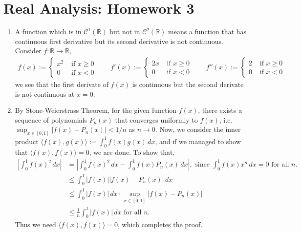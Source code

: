 \documentclass[a4paper,12pt]{article}
\theoremstyle{definition}
\begin{document}
\section*{Real Analysis: Homework 3}

\begin{enumerate}
\item
A function which is in $\mathcal{C}^1(\mathbb{R})$ but not in $\mathcal{C}^2(\mathbb{R})$ means a function that has continuous first derivative but its second derivative is not continuous. Consider $f: \mathbb{R} \to \mathbb{R}$,
\begin{align*}
f(x):=\begin{cases}
x^2 & \text{ if }x \geq 0\\
0 & \text{ if }x <0
\end{cases}\qquad
f'(x):=\begin{cases}
2x & \text{ if }x \geq 0\\
0 & \text{ if }x <0
\end{cases}\qquad
f''(x):=\begin{cases}
2 & \text{ if }x \geq 0\\
0 & \text{ if }x <0
\end{cases}
\end{align*}
we see that the first derivate of $f(x)$ is continuous but the second derivate is not continuous at $x =0$.



\item By Stone-Weierstrass Theorem, for the given function $f(x)$, there exists a sequence of polynomials $P_n(x)$ that converges uniformly to $f(x)$, i.e. $\sup_{x \in [0,1]}|f(x)-P_n(x)| <1/n$ as $n \to 0$. Now, we consider the inner product $\langle f(x), g(x)\rangle:= \int_{0}^{1}f(x)g(x)\,dx$, and if we managed to show that $\langle f(x),f(x)\rangle=0$, we are done. To show that, 
\begin{align*}
\left|\int_{0}^{1}f(x)^2\,dx\right| &= \left|\int_{0}^{1}f(x)^2\,dx-\int_{0}^{1}f(x)P_n(x)\,dx\right| ,\text{ since $\int_{0}^{1}f(x)x^n\,dx=0$ for all $n$.}\\
&\leq \int_{0}^{1} \left|f(x)\right|\left| f(x)-P_n(x)\right|\,dx \\
&\leq \int_{0}^{1} \left|f(x)\right|\,dx \cdot \sup_{x\in [0,1]}|f(x)-P_n(x)|\\
&\leq \frac{1}{n}\int_{0}^{1} \left|f(x)\right|\,dx \text{ for all $n$.}
\end{align*}
Thus we need $\langle f(x), f(x) \rangle=0$, which completes the proof.




\end{enumerate}
\end{document}
